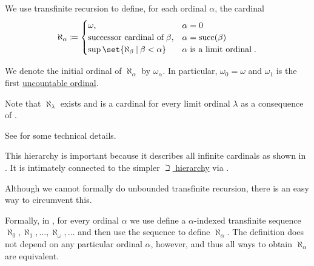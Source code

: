 \begin{definition}\label{def:aleph_hierarchy}
  We use transfinite recursion to define, for each ordinal \( \alpha \), the cardinal
  \begin{equation}\label{eq:def:aleph_hierarchy}
    \aleph_\alpha \coloneqq \begin{cases}
      \omega,                                        &\alpha = 0 \\
      \T{successor cardinal of} \beta,               &\alpha = \op{succ}(\beta) \\
      \sup\set{ \aleph_\beta \given \beta < \alpha } &\alpha \T{is a limit ordinal}.
    \end{cases}
  \end{equation}

  We denote the initial ordinal of \( \aleph_\alpha \) by \( \omega_\alpha \). In particular, \( \omega_0 = \omega \) and \( \omega_1 \) is the first \hyperref[def:set_countability/uncountable]{uncountable ordinal}.

  Note that \( \aleph_\lambda \) exists and is a cardinal for every limit ordinal \( \lambda \) as a consequence of .

  See  for some technical details.

  This hierarchy is important because it describes all infinite cardinals as shown in . It is intimately connected to the simpler \hyperref[def:beth_hierarchy]{\( \beth \) hierarchy} via .
\end{definition}

\begin{remark}\label{rem:unbounded_transfinite_recursion}
  Although we cannot formally do unbounded transfinite recursion, there is an easy way to circumvent this.

  Formally, in , for every ordinal \( \alpha \) we use  define a \( \alpha \)-indexed transfinite sequence \( \aleph_0, \aleph_1, \ldots, \aleph_\omega, \ldots \) and then use the sequence to define \( \aleph_\alpha \). The definition does not depend on any particular ordinal \( \alpha \), however, and thus all ways to obtain \( \aleph_\alpha \) are equivalent.
\end{remark}

